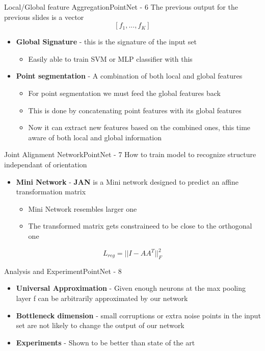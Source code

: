 \documentclass{beamer}
\begin{document}
		\begin{frame}{Local/Global feature Aggregation}{PointNet - 6}
			The previous output for the previous slides is a vector \[[f_1,...,f_K]\]
			\begin{itemize}
				\item \textbf{Global Signature} - this is the signature of the input set
                \begin{itemize}
                    \item Easily able to train SVM or MLP classifier with this
                \end{itemize}
				\item \textbf{Point segmentation} - A combination of both local and global features
                \begin{itemize}
                    \item For point segmentation we must feed the global features back 
                    \item This is done by concatenating point features with its global features
                    \item Now it can extract new features based on the combined ones, this time aware of both local and global information
                \end{itemize}
			\end{itemize}
		\end{frame}
		
		\begin{frame}{Joint Alignment Network}{PointNet - 7}
			How to train model to recognize structure independant of orientation
			\begin{itemize}
				\item \textbf{Mini Network} - \textbf{JAN} is a Mini network designed to predict an affine transformation matrix
                	\begin{itemize}
                        \item Mini Network resembles larger one
                        \item The transformed matrix gets constraineed to be close to the orthogonal one
        			\end{itemize}
			\end{itemize}
            \[L_{reg}=||I-AA^T||^2_F\]
		\end{frame}
		
		\begin{frame}{Analysis and Experiment}{PointNet - 8}
			\begin{itemize}
				\item \textbf{Universal Approximation} - Given enough neurons at the max pooling layer f can be arbitrarily approximated by our network
				\item \textbf{Bottleneck dimension} - small corruptions or extra noise points in the input set are not likely to change the output of our network
				\item \textbf{Experiments} - Shown to be better than state of the art
			\end{itemize}
		\end{frame}
\end{document}
